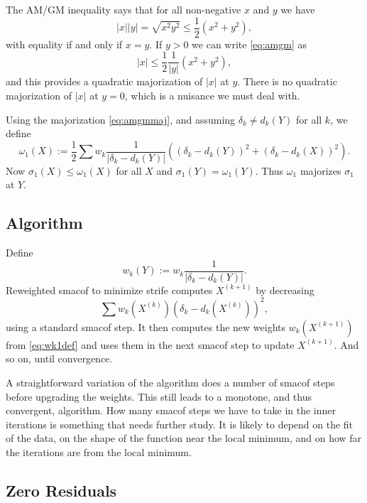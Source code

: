 \documentclass[
  12pt,
  letterpaper,
  DIV=11,
  numbers=noendperiod]{scrartcl}
\begin{document}
The AM/GM inequality says that for all non-negative \(x\) and \(y\) we
have \begin{equation}
|x||y|=\sqrt{x^2y^2}\leq\frac12(x^2+y^2),\label{eq:amgm}
\end{equation} with equality if and only if \(x=y\). If \(y>0\) we can
write \eqref{eq:amgm} as \begin{equation}
|x|\leq\frac12\frac{1}{|y|}(x^2+y^2),\label{eq:amgmmaj}
\end{equation} and this provides a quadratic majorization of \(|x|\) at
\(y\). There is no quadratic majorization of \(|x|\) at \(y=0\), which
is a nuisance we must deal with.

Using the majorization \eqref{eq:amgmmaj}, and assuming
\(\delta_k\not= d_k(Y)\) for all \(k\), we define \begin{equation}
\omega_1(X):=\frac12\sum w_k\frac{1}{|\delta_k-d_k(Y)|}((\delta_k-d_k(Y))^2+(\delta_k-d_k(X))^2).\label{eq:omegadef}
\end{equation} Now \(\sigma_1(X)\leq\omega_1(X)\) for all \(X\) and
\(\sigma_1(Y)=\omega_1(Y)\). Thus \(\omega_1\) majorizes \(\sigma_1\) at
\(Y\).

\subsection{Algorithm}\label{algorithm}

Define \begin{equation}
w_k(Y):=w_k\frac{1}{|\delta_k-d_k(Y)|}.\label{eq:wk1def}
\end{equation} Reweighted smacof to minimize strife computes
\(X^{(k+1)}\) by decreasing \begin{equation}
\sum w_k(X^{(k)})(\delta_k-d_k(X^{(k)}))^2,\label{eq:sstrf}
\end{equation} using a standard smacof step. It then computes the new
weights \(w_k(X^{(k+1)})\) from \eqref{eq:wk1def} and uses them in the
next smacof step to update \(X^{(k+1)}\). And so on, until convergence.

A straightforward variation of the algorithm does a number of smacof
steps before upgrading the weights. This still leads to a monotone, and
thus convergent, algorithm. How many smacof steps we have to take in the
inner iterations is something that needs further study. It is likely to
depend on the fit of the data, on the shape of the function near the
local minimum, and on how far the iterations are from the local minimum.

\subsection{Zero Residuals}\label{zero-residuals}
\end{document}

